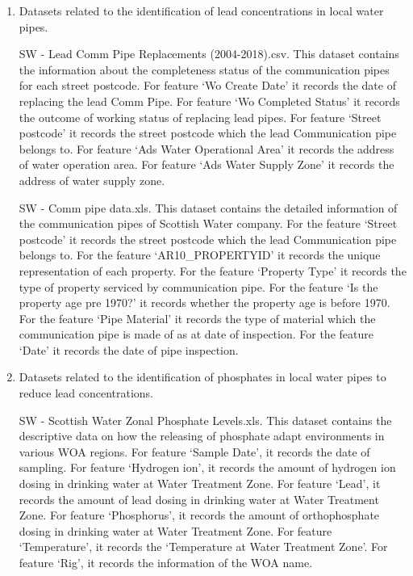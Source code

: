 \documentclass[11pt,twoside]{article}
\numberwithin{Theorem}{section}
\numberwithin{Definition}{section}
\numberwithin{Lemma}{section}
\numberwithin{Algorithm}{section}
\numberwithin{equation}{section}
\begin{document}
\begin{enumerate}

\item Datasets related to the identification of lead concentrations in local water pipes.

SW - Lead Comm Pipe Replacements (2004-2018).csv. This dataset contains the information about the completeness status of the communication pipes for each street postcode. For feature `Wo Create Date' it records the date of replacing the lead Comm Pipe. For feature `Wo Completed Status' it records the outcome of working status of replacing lead pipes. For feature `Street postcode' it records the street postcode which the lead Communication pipe belongs to. For feature `Ads Water Operational Area' it records the address of water operation area. For feature `Ads Water Supply Zone' it records the address of water supply zone.

SW - Comm pipe data.xls. This dataset contains the detailed information of the communication pipes of Scottish Water company. For the feature `Street postcode' it records the street postcode which the lead Communication pipe belongs to. For the feature `AR10\_PROPERTYID' it records the unique representation of each property. For the feature `Property Type' it records the type of property serviced by communication pipe. For the feature `Is the property age pre 1970?' it records whether the property age is before 1970. For the feature `Pipe Material' it records the type of material which the communication pipe is made of as at date of inspection. For the feature `Date' it records the date of pipe inspection.

\item Datasets related to the identification of phosphates in local water pipes to reduce lead concentrations.

SW - Scottish Water Zonal Phosphate Levels.xls. This dataset contains the descriptive data on how the releasing of phosphate adapt environments in various WOA regions. For feature `Sample Date', it records the date of sampling. For feature `Hydrogen ion', it records the amount of hydrogen ion dosing in drinking water at Water Treatment Zone. For feature `Lead', it records the amount of lead dosing in drinking water at Water Treatment Zone. For feature `Phosphorus', it records the amount of orthophosphate dosing in drinking water at Water Treatment Zone. For feature `Temperature', it records the `Temperature at Water Treatment Zone'. For feature `Rig', it records the information of the WOA name.


\end{enumerate}
\end{document}
